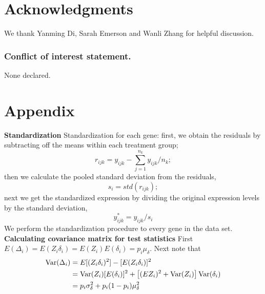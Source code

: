 \documentclass[a4,center,fleqn]{NAR}
\begin{document}
	
	
	
	
	
	\section{Acknowledgments}\label{section:acknowledgment}
	
	We thank Yanming Di, Sarah Emerson and Wanli Zhang for helpful discussion. 
	
	
	\subsubsection{Conflict of interest statement.} None declared.
	
	\newpage
	
		\section*{Appendix}\label{section:appendix}
		
		
		\textbf{Standardization} 
		Standardization for each gene: first, we obtain the residuals by subtracting off the means within
		each treatment group;
		\begin{equation}
			r_{ijk} = y_{ijk} - \sum_{j=1}^{n_k}{y}_{ijk}/n_k;
		\end{equation}
		then we calculate the pooled standard deviation from the residuals,
		\begin{equation}
			s_i = \textit{std}(r_{ijk});
		\end{equation}
		next we get the standardized expression by dividing the original expression levels by the
		standard deviation,
		\begin{equation}
			y^{\ast}_{ijk} = y_{ijk}/s_i
		\end{equation}
		We perform the standardization procedure to every gene in the data set.\\
		\textbf{Calculating covariance matrix for test statistics}
		First $E(\Delta_i) = E(Z_i\delta_i) = E(Z_i)E(\delta_i) = p_i\mu_{\delta}$. Next note that  
		\begin{equation}\notag
			\begin{aligned}
				\text{Var}(\Delta_i) & = E[(Z_i\delta_i)^2]- [E(Z_i\delta_i)]^2 \\
				& = \text{Var}(Z_i)[E(\delta_i)]^2 + \left[(EZ_i)^2 + \text{Var}(Z_i)\right]\text{Var}(\delta_i) \\
				& =p_i\sigma_{\delta}^2 + p_i(1-p_i)\mu_{\delta}^2
			\end{aligned}
		\end{equation}
		
\end{document}
